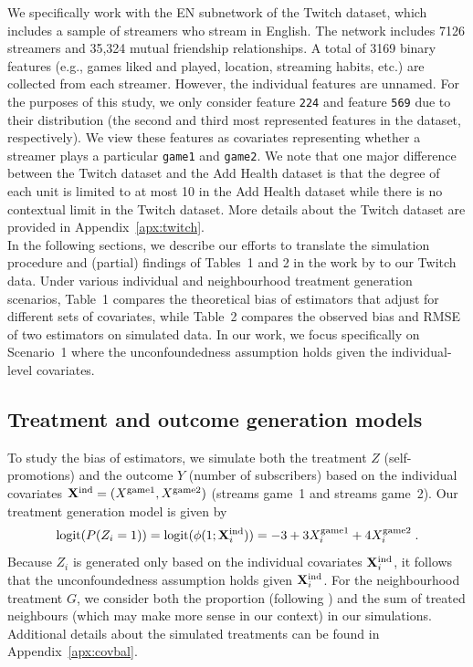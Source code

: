 \documentclass[10pt]{article}
\begin{document}
We specifically work with the EN subnetwork of the Twitch dataset, which includes a sample of streamers who stream in English. The network includes 7126 streamers and 35,324 mutual friendship relationships. A total of 3169 binary features (e.g., games liked and played, location, streaming habits, etc.) are collected from each streamer. However, the individual features are unnamed. For the purposes of this study, we only consider feature \verb|224| and feature \verb|569| due to their distribution (the second and third most represented features in the dataset, respectively). We view these features as covariates representing whether a streamer plays a particular \verb|game1| and \verb|game2|. We note that one major difference between the Twitch dataset and the Add Health dataset is that the degree of each unit is limited to at most 10 in the Add Health dataset while there is no contextual limit in the Twitch dataset. More details about the Twitch dataset are provided in Appendix~\ref{apx:twitch}.
\\

In the following sections, we describe our efforts to translate the simulation procedure and (partial) findings of Tables~1 and 2 in the work by \textcite{Forastiere:2021} to our Twitch data. Under various individual and neighbourhood treatment generation scenarios, Table~1 compares the theoretical bias of estimators that adjust for different sets of covariates, while Table~2 compares the observed bias and RMSE of two estimators on simulated data. In our work, we focus specifically on Scenario~1 where the unconfoundedness assumption holds given the individual-level covariates.

\subsection{Treatment and outcome generation models} \label{sec:models}

To study the bias of estimators, we simulate both the treatment $Z$ (self-promotions) and the outcome $Y$ (number of subscribers) based on the individual covariates $\mathbf{X}^{\text{ind}}=(X^\text{game1},X^\text{game2})$ (streams game~1 and streams game~2). Our treatment generation model is given by
\[
\text{logit}(P(Z_i=1)) = \text{logit}(\phi(1;\mathbf{X}^{\text{ind}}_i)) = -3 + 3X_i^\text{game1} + 4X_i^\text{game2} \;.
\]
Because $Z_i$ is generated only based on the individual covariates $\mathbf{X}^{\text{ind}}_i$, it follows that the unconfoundedness assumption holds given $\mathbf{X}^{\text{ind}}_i$. For the neighbourhood treatment $G$, we consider both the proportion (following \citeauthor{Forastiere:2021}) and the sum of treated neighbours (which may make more sense in our context) in our simulations. Additional details about the simulated treatments can be found in Appendix~\ref{apx:covbal}.
\\
\end{document}

